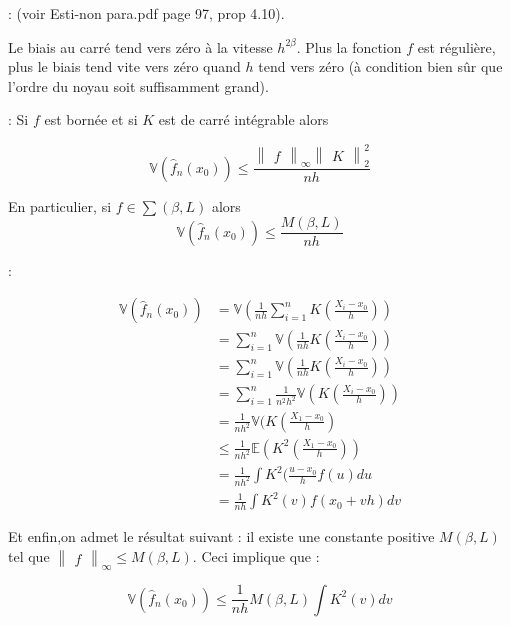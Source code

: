 \documentclass[
]{book}
\begin{document}
\begin{demo}: (voir Esti-non para.pdf page 97, prop 4.10).\newline

   Le biais au carré tend vers zéro à la vitesse $h^{2\beta}$. Plus la fonction $f$ est régulière, plus le biais tend vite vers zéro quand $h$ tend vers zéro (à condition bien sûr que l'ordre du noyau soit suffisamment grand).\newline
\end{demo} 
\begin{prop}: Si $f$ est bornée et si $K$ est de carré intégrable alors 

$$
\mathbb{V}(\hat {f}_n(x_0)) \leqslant \frac{\begin{Vmatrix}f\end{Vmatrix}_{\infty}\begin{Vmatrix}K\end{Vmatrix}^2_2}{nh}
$$

En particulier, si $f \in \sum(\beta,L)$ alors
$$
\mathbb{V}(\hat{f}_n(x_0))\leqslant\frac{M(\beta, L)}{nh}
$$
\end{prop}
\begin{demo}:


$$
\begin{aligned}
\mathbb{V}(\hat {f}_n(x_0)) &= \mathbb{V}(\frac{1}{nh}\sum_{i=1}^nK(\frac{X_i-x_0}{h})) \\
&=\sum_{i=1}^n\mathbb{V}(\frac{1}{nh}K(\frac{X_i-x_0}{h})) \\
&=\sum_{i=1}^n\mathbb{V}(\frac{1}{nh}K(\frac{X_i-x_0}{h}))  \\           &=\sum_{i=1}^n\frac{1}{n^2h^2}\mathbb{V}(K(\frac{X_i-x_0}{h})) \\
&=\frac{1}{nh^2}\mathbb{V}(K(\frac{X_1-x_0}{h}) \\
&\leqslant \frac{1}{nh^2}\mathbb{E}(K^2(\frac{X_1-x_0}{h})) \\
&=\frac{1}{nh^2}\int K^2(\frac{u-x_0}{h}f(u)du \\
&=\frac{1}{nh}\int K^2(v)f(x_0 +vh)dv
\end{aligned}
$$ 


Et enfin,on admet le résultat suivant : \newline
il existe une constante positive $M(\beta,L)$ tel que $\begin{Vmatrix}f\end{Vmatrix}_{\infty} \leqslant M(\beta, L)$. Ceci implique que :

$$
 \mathbb{V}(\hat {f}_n(x_0))\leqslant\frac{1}{nh}M(\beta, L)\int K^2(v)dv 
$$ 
 \end{demo}
\end{document}
